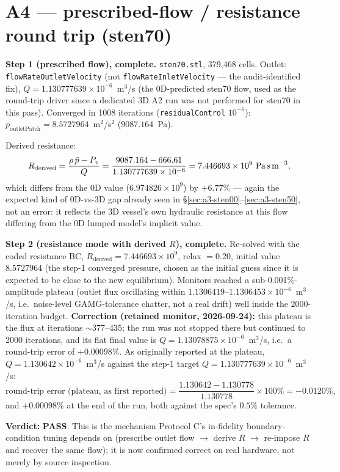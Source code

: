 \documentclass[11pt]{article}
\newcommand{\PASS}{\textcolor{passgreen}{\textbf{PASS}}}
\begin{document}
\section{A4 --- prescribed-flow / resistance round trip (sten70)}
\label{sec:a4}
\textbf{Step 1 (prescribed flow), complete.} \texttt{sten70.stl}, 379{,}468 cells. Outlet:
\texttt{flowRateOutletVelocity} (not \texttt{flowRateInletVelocity} --- the audit-identified fix),
$Q=1.130777639\times10^{-6}$~m$^3$/s (the 0D-predicted sten70 flow, used as the round-trip driver
since a dedicated 3D A2 run was not performed for sten70 in this pass). Converged in 1008 iterations
(\texttt{residualControl} $10^{-6}$): $p_{\text{outletPatch}}=8.5727964$~m$^2$/s$^2$ ($9087.164$~Pa).

Derived resistance:
\[
R_{\text{derived}} = \frac{\rho\,\bar p - P_v}{Q} = \frac{9087.164 - 666.61}{1.130777639\times10^{-6}}
= 7.446693\times10^9~\text{Pa\,s\,m}^{-3},
\]
which differs from the 0D value ($6.974826\times10^9$) by $+6.77\%$ --- again the expected kind of
0D-vs-3D gap already seen in \S\ref{sec:a3-sten00}--\ref{sec:a3-sten50}, not an error: it reflects
the 3D vessel's own hydraulic resistance at this flow differing from the 0D lumped model's implicit
value.

\textbf{Step 2 (resistance mode with derived $R$), complete.} Re-solved with the coded resistance BC,
$R_{\text{derived}}=7.446693\times10^9$, relax $=0.20$, initial value $8.5727964$ (the step-1 converged
pressure, chosen as the initial guess since it is expected to be close to the new equilibrium).
Monitors reached a sub-0.001\%-amplitude plateau (outlet flux oscillating within
$1.1306419$--$1.1306453\times10^{-6}$~m$^3$/s, i.e.\ noise-level GAMG-tolerance chatter, not a real
drift) well inside the 2000-iteration budget. \textbf{Correction (retained monitor, 2026-09-24):} this plateau is the flux at iterations $\sim$377--435; the run was not stopped there but continued to 2000 iterations, and its flat final value is $Q = 1.13078875\times10^{-6}$~m$^3$/s, i.e.\ a round-trip error of $+0.00098\%$. As originally reported at the plateau,
$Q = 1.130642\times10^{-6}$~m$^3$/s against the step-1 target
$Q=1.130777639\times10^{-6}$~m$^3$/s:
\[
\text{round-trip error (plateau, as first reported)} = \frac{1.130642 - 1.130778}{1.130778}\times100\% = -0.0120\%,
\]
and $+0.00098\%$ at the end of the run, both against the spec's $0.5\%$ tolerance.

\textbf{Verdict:} \PASS{}. This is the mechanism Protocol C's in-fidelity boundary-condition tuning
depends on (prescribe outlet flow $\to$ derive $R$ $\to$ re-impose $R$ and recover the same flow);
it is now confirmed correct on real hardware, not merely by source inspection.
\end{document}
